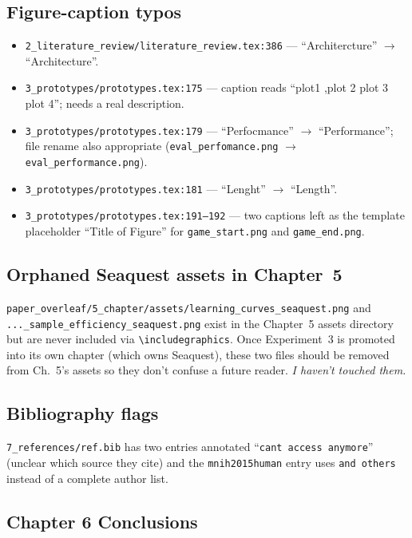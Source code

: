 \documentclass[11pt,a4paper]{article}
\newcommand{\fileline}[1]{\texttt{\small #1}}
\begin{document}
\subsection*{Figure-caption typos}

\begin{itemize}[leftmargin=*]
  \item \fileline{2\_literature\_review/literature\_review.tex:386} ---
  ``Architercture'' $\to$ ``Architecture''.
  \item \fileline{3\_prototypes/prototypes.tex:175} --- caption reads
  ``plot1 ,plot 2 plot 3 plot 4''; needs a real description.
  \item \fileline{3\_prototypes/prototypes.tex:179} --- ``Perfocmance'' $\to$
  ``Performance''; file rename also appropriate
  (\fileline{eval\_perfomance.png} $\to$ \fileline{eval\_performance.png}).
  \item \fileline{3\_prototypes/prototypes.tex:181} --- ``Lenght'' $\to$
  ``Length''.
  \item \fileline{3\_prototypes/prototypes.tex:191--192} --- two captions
  left as the template placeholder ``Title of Figure'' for
  \fileline{game\_start.png} and \fileline{game\_end.png}.
\end{itemize}

\subsection*{Orphaned Seaquest assets in Chapter~5}

\fileline{paper\_overleaf/5\_chapter/assets/learning\_curves\_seaquest.png}
and \fileline{...\_sample\_efficiency\_seaquest.png} exist in the
Chapter~5 assets directory but are never included via
\fileline{\textbackslash includegraphics}. Once Experiment~3 is promoted
into its own chapter (which owns Seaquest), these two files should be
removed from Ch.~5's assets so they don't confuse a future reader.
\emph{I haven't touched them.}

\subsection*{Bibliography flags}

\fileline{7\_references/ref.bib} has two entries annotated
``\texttt{cant access anymore}'' (unclear which source they cite) and the
\fileline{mnih2015human} entry uses \texttt{and others} instead of a
complete author list.

\subsection*{Chapter 6 Conclusions}
\end{document}
